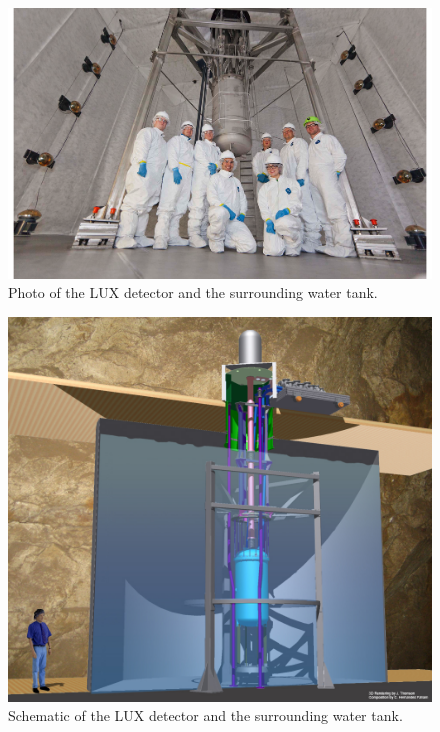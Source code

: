  \begin{figure}[h!]\centering
\includegraphics[scale=0.5]{Chapter_LUX_Det/LUX_Real.png}
\caption{Photo of the LUX detector and the surrounding water tank.}
\label{fig:LUX_Real}
\end{figure}

\begin{figure}[h!]\centering
\includegraphics[scale=0.35]{Chapter_LUX_Det/Davis_3D_tank.jpg}
\caption{Schematic of the LUX detector and the surrounding water tank.}
\label{fig:LUX_Davis}
\end{figure}

